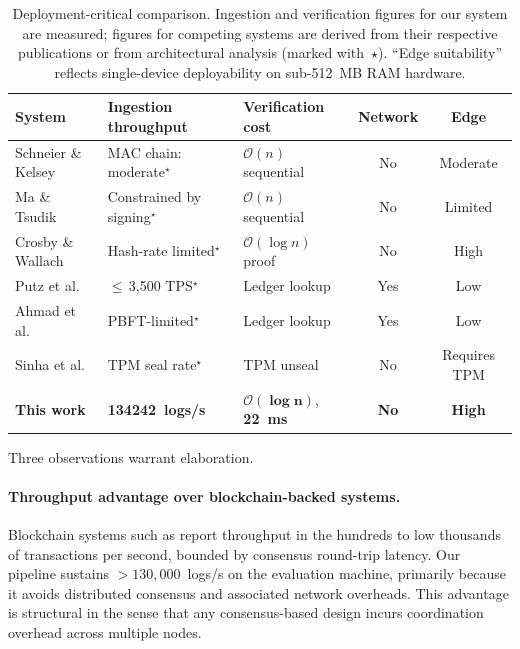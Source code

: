 \documentclass[preprint,12pt]{elsarticle}
\begin{document}
\begin{table}[t]
\centering
\caption{Deployment-critical comparison.
Ingestion and verification figures for our system are measured; figures for competing systems are derived from their respective publications or from architectural analysis (marked with~$\star$).
``Edge suitability'' reflects single-device deployability on sub-\SI{512}{MB} RAM hardware.}
\label{tab:comparative}
\small
\renewcommand{\arraystretch}{1.35}
\setlength{\tabcolsep}{4pt}
\begin{tabularx}{\textwidth}{@{} l
  >{\raggedright\arraybackslash}X
  >{\raggedright\arraybackslash}X
  c
  c @{}}
\toprule
\textbf{System} &
\textbf{Ingestion throughput} &
\textbf{Verification cost} &
\textbf{Network} &
\textbf{Edge} \\
\midrule
Schneier \& Kelsey \citeyearpar{schneier1999secure}
  & MAC chain: moderate$^\star$
  & $\mathcal{O}(n)$ sequential
  & No
  & Moderate \\
Ma \& Tsudik \citeyearpar{ma2009new}
  & Constrained by signing$^\star$
  & $\mathcal{O}(n)$ sequential
  & No
  & Limited \\
Crosby \& Wallach \citeyearpar{crosby2009efficient}
  & Hash-rate limited$^\star$
  & $\mathcal{O}(\log n)$ proof
  & No
  & High \\
Putz et al. \citeyearpar{putz2019secure}
  & $\le$\,3{,}500 TPS$^\star$
  & Ledger lookup
  & Yes
  & Low \\
Ahmad et al. \citeyearpar{ahmad2019blockaudit}
  & PBFT-limited$^\star$
  & Ledger lookup
  & Yes
  & Low \\
Sinha et al. \citeyearpar{sinha2014continuous}
  & TPM seal rate$^\star$
  & TPM unseal
  & No
  & Requires TPM \\
\rowcolor{cHighlight}
\textbf{This work}
  & \textbf{\SI{134242}{logs/s}}
  & $\boldsymbol{\mathcal{O}(\log n)}$, \textbf{\SI{22}{ms}}
  & \textbf{No}
  & \textbf{High} \\
\bottomrule
\end{tabularx}
\end{table}

Three observations warrant elaboration.

\paragraph{Throughput advantage over blockchain-backed systems.}
Blockchain systems such as \citet{putz2019secure} report throughput in the hundreds to low thousands of transactions per second, bounded by consensus round-trip latency.
Our pipeline sustains $>\!130{,}000$~logs/s on the evaluation machine, primarily because it avoids distributed consensus and associated network overheads.
This advantage is structural in the sense that any consensus-based design incurs coordination overhead across multiple nodes.
\end{document}
